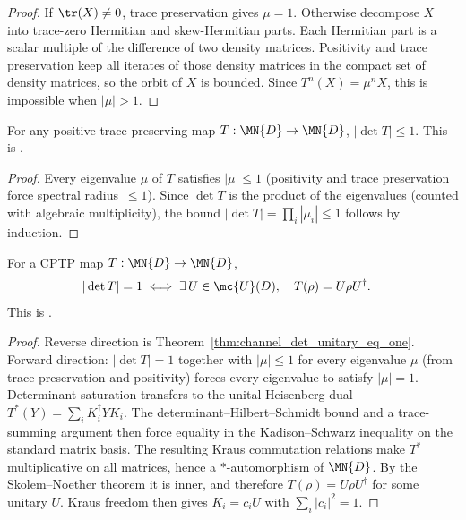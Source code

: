 \begin{proof}\leanok
    If $\tr(X)\neq0$, trace preservation gives $\mu=1$. Otherwise decompose
    $X$ into trace-zero Hermitian and skew-Hermitian parts. Each Hermitian
    part is a scalar multiple of the difference of two density matrices.
    Positivity and trace preservation keep all iterates of those density
    matrices in the compact set of density matrices, so the orbit of $X$ is
    bounded. Since $T^n(X)=\mu^nX$, this is impossible when $|\mu|>1$.
\end{proof}

\begin{theorem}
    \label{thm:channelDet_norm_le_one}
    \leanok
    For any positive trace-preserving map $T : \MN{D} \to \MN{D}$,
    $|\det T|\leq1$.
    This is \cite[Theorem~6.1(1)]{Wolf2012Quantum}.
\end{theorem}

\begin{proof}\leanok
    Every eigenvalue $\mu$ of $T$ satisfies $|\mu|\leq1$
    (positivity and trace preservation force spectral radius~$\leq1$).
    Since $\det T$ is the product of the eigenvalues
    (counted with algebraic multiplicity), the bound
    $|\det T|=\prod_i|\mu_i|\leq1$ follows by induction.
\end{proof}

\begin{theorem}
    \label{thm:channelDet_norm_eq_one_iff_unitary}
    \leanok
    For a CPTP map $T : \MN{D} \to \MN{D}$,
    \begin{align}
        |\det T|=1
        &\iff
        \exists\,U \in \mc{U}(D),\quad T(\rho)=U\rho U^\dagger.
        \label{eq:representations_det_unitary_iff}
    \end{align}
    This is \cite[Theorem~6.1(2)]{Wolf2012Quantum}.
\end{theorem}

\begin{proof}
    \leanok
    Reverse direction is Theorem~\ref{thm:channel_det_unitary_eq_one}.
    Forward direction: $|\det T|=1$ together with $|\mu|\leq1$ for every
    eigenvalue $\mu$ (from trace preservation and positivity) forces every
    eigenvalue to satisfy $|\mu|=1$. Determinant saturation transfers to the
    unital Heisenberg dual $T^*(Y)=\sum_iK_i^\dagger YK_i$. The
    determinant--Hilbert--Schmidt bound and a trace-summing argument then force
    equality in the Kadison--Schwarz inequality on the standard matrix basis.
    The resulting Kraus commutation relations make $T^*$ multiplicative on all
    matrices, hence a $*$-automorphism of $\MN{D}$. By the Skolem--Noether
    theorem it is inner, and therefore
    $T(\rho)=U\rho U^\dagger$ for some unitary $U$. Kraus freedom then gives
    $K_i=c_iU$ with $\sum_i|c_i|^2=1$.
\end{proof}
